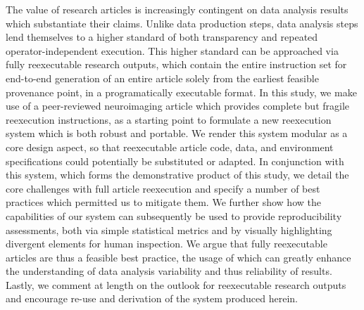 The value of research articles is increasingly contingent on data analysis results which substantiate their claims.
Unlike data production steps, data analysis steps lend themselves to a higher standard of both transparency and repeated operator-independent execution.
This higher standard can be approached via fully reexecutable research outputs, which contain the entire instruction set for end-to-end generation of an entire article solely from the earliest feasible provenance point, in a programatically executable format.
In this study, we make use of a peer-reviewed neuroimaging article which provides complete but fragile reexecution instructions, as a starting point to formulate a new reexecution system which is both robust and portable.
We render this system modular as a core design aspect, so that reexecutable article code, data, and environment specifications could potentially be substituted or adapted.
In conjunction with this system, which forms the demonstrative product of this study, we detail the core challenges with full article reexecution and specify a number of best practices which permitted us to mitigate them.
We further show how the capabilities of our system can subsequently be used to provide reproducibility assessments, both via simple statistical metrics and by visually highlighting divergent elements for human inspection.
We argue that fully reexecutable articles are thus a feasible best practice, the usage of which can greatly enhance the understanding of data analysis variability and thus reliability of results.
Lastly, we comment at length on the outlook for reexecutable research outputs and encourage re-use and derivation of the system produced herein.

